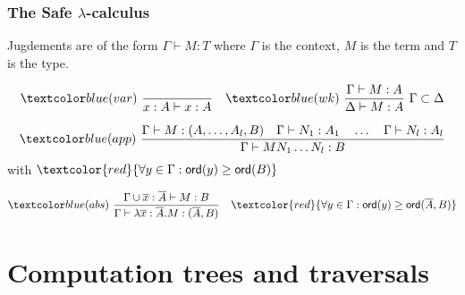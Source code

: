 

\begin{frame}[fragile]
\frametitle{The Safe $\lambda$-calculus}
Jugdements are of the form $ \Gamma \vdash M : T $ where $\Gamma$ is the context, $M$ is the term and $T$ is the type.

$$ \rulename{var} \   \rulef{}{x : A\vdash x : A}
\quad  \rulename{wk} \   \rulef{\Gamma \vdash M : A}{\Delta \vdash M : A} \ \Gamma \subset \Delta$$

$$ \rulename{app} \  \rulef{\Gamma \vdash M : (A,\ldots,A_l,B)
                                        \quad \Gamma \vdash N_1 : A_1
                                        \quad \ldots \quad \Gamma \vdash N_l : A_l  }
                                   {\Gamma  \vdash M N_1 \ldots N_l : B}$$
\hfill with  $\textcolor{red}{\forall y \in \Gamma : \ord{y} \geq \ord{B}}$

$$ \rulename{abs} \   \rulef{\Gamma \union \overline{x} : \overline{A} \vdash M : B}
                                   {\Gamma  \vdash \lambda \overline{x} : \overline{A} . M : (\overline{A},B)} \quad
                                   \textcolor{red}{\forall y \in \Gamma : \ord{y} \geq \ord{\overline{A},B}}$$

\end{frame}






\section{Computation trees and traversals}

